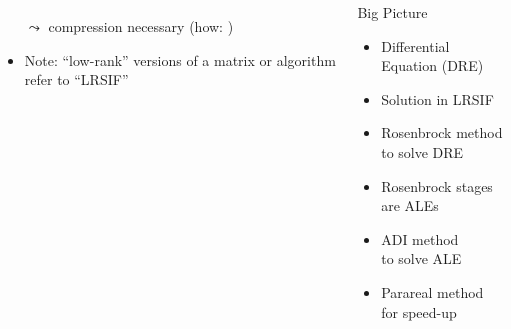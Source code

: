 \begin{frame}
\begin{columns}
\begin{itemize}
\begin{equation*}
      \end{equation*}
      $\leadsto$ compression necessary
      (how: \cite{Lang2017})
    \item
      Note: \enquote{low-rank} versions of a matrix or algorithm refer to \enquote{LRSIF}
  \end{itemize}
  \begin{block}{Big Picture}
    \begin{itemize}
      \item
        Differential \Riccati Equation (DRE)
      \item
        Solution in LRSIF
      \pause
      \item
        Rosenbrock method\\ to solve DRE
      \item
        Rosenbrock stages are ALEs
      \item
        ADI method\\ to solve ALE
      \item
        Parareal method\\ for speed-up
    \end{itemize}
  \end{block}
\end{columns}
\end{frame}
